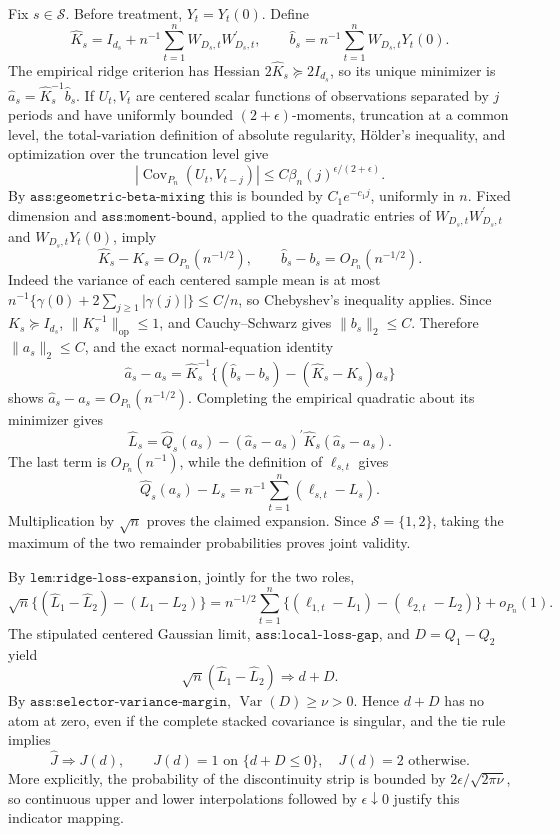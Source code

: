 Fix \(s\in\mathcal S\).  Before treatment, \(Y_t=Y_t(0)\).  Define
\[
 \widehat K_s=I_{d_s}+n^{-1}\sum_{t=1}^nW_{D_s,t}W_{D_s,t}^{\prime},
 \qquad
 \widehat b_s=n^{-1}\sum_{t=1}^nW_{D_s,t}Y_t(0).
\]
The empirical ridge criterion has Hessian \(2\widehat K_s\succeq2I_{d_s}\), so its unique minimizer is \(\widehat a_s=\widehat K_s^{-1}\widehat b_s\).  If \(U_t,V_t\) are centered scalar functions of observations separated by \(j\) periods and have uniformly bounded \((2+\epsilon)\)-moments, truncation at a common level, the total-variation definition of absolute regularity, H\"older's inequality, and optimization over the truncation level give
\[
 |\operatorname{Cov}_{P_n}(U_t,V_{t-j})|
 \leq C\beta_n(j)^{\epsilon/(2+\epsilon)}.
\]
By \(\texttt{ass:geometric-beta-mixing}\) this is bounded by \(C_1e^{-c_1j}\), uniformly in \(n\).  Fixed dimension and \(\texttt{ass:moment-bound}\), applied to the quadratic entries of \(W_{D_s,t}W_{D_s,t}^{\prime}\) and \(W_{D_s,t}Y_t(0)\), imply
\[
 \widehat K_s-K_s=O_{P_n}(n^{-1/2}),
 \qquad \widehat b_s-b_s=O_{P_n}(n^{-1/2}).
\]
Indeed the variance of each centered sample mean is at most \(n^{-1}\{\gamma(0)+2\sum_{j\geq1}|\gamma(j)|\}\leq C/n\), so Chebyshev's inequality applies.  Since \(K_s\succeq I_{d_s}\), \(\|K_s^{-1}\|_{\mathrm{op}}\leq1\), and Cauchy--Schwarz gives \(\|b_s\|_2\leq C\).  Therefore \(\|a_s\|_2\leq C\), and the exact normal-equation identity
\[
 \widehat a_s-a_s
 =\widehat K_s^{-1}\{(\widehat b_s-b_s)
  -(\widehat K_s-K_s)a_s\}
\]
shows \(\widehat a_s-a_s=O_{P_n}(n^{-1/2})\).  Completing the empirical quadratic about its minimizer gives
\[
 \widehat L_s
 =\widehat Q_s(a_s)
  -(\widehat a_s-a_s)^{\prime}\widehat K_s(\widehat a_s-a_s).
\]
The last term is \(O_{P_n}(n^{-1})\), while the definition of \(\ell_{s,t}\) gives
\[
 \widehat Q_s(a_s)-L_s=n^{-1}\sum_{t=1}^n(\ell_{s,t}-L_s).
\]
Multiplication by \(\sqrt n\) proves the claimed expansion.  Since \(\mathcal S=\{1,2\}\), taking the maximum of the two remainder probabilities proves joint validity.

By \(\texttt{lem:ridge-loss-expansion}\), jointly for the two roles,
\[
 \sqrt n\{(\widehat L_1-\widehat L_2)-(L_1-L_2)\}
 =n^{-1/2}\sum_{t=1}^n\{(\ell_{1,t}-L_1)-(\ell_{2,t}-L_2)\}+o_{P_n}(1).
\]
The stipulated centered Gaussian limit, \(\texttt{ass:local-loss-gap}\), and \(D=Q_1-Q_2\) yield
\[
 \sqrt n(\widehat L_1-\widehat L_2)\Rightarrow d+D.
\]
By \(\texttt{ass:selector-variance-margin}\), \(\operatorname{Var}(D)\geq\nu>0\).  Hence \(d+D\) has no atom at zero, even if the complete stacked covariance is singular, and the tie rule implies
\[
 \widehat J\Rightarrow J(d),\qquad
 J(d)=1\text{ on }\{d+D\leq0\},\quad J(d)=2\text{ otherwise}.
\]
More explicitly, the probability of the discontinuity strip is bounded by \(2\epsilon/\sqrt{2\pi\nu}\), so continuous upper and lower interpolations followed by \(\epsilon\downarrow0\) justify this indicator mapping.

